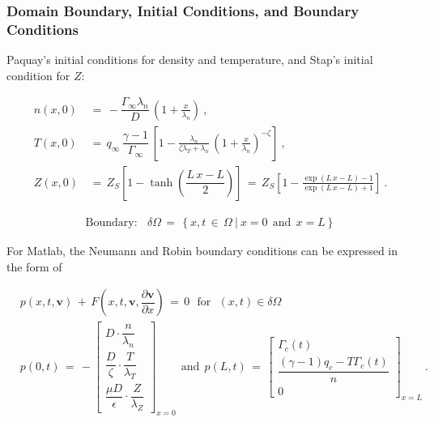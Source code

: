 \documentclass[a4paper,8pt]{article}
\begin{document}
\subsubsection{Domain Boundary, Initial Conditions, and Boundary
Conditions}\label{domain-boundary-initial-conditions-and-boundary-conditions}

Paquay's initial conditions for density and temperature, and Stap's
initial condition for \(Z\):

\begin{align}
    n(x,0) \,&=\, -\dfrac{\Gamma_\infty \lambda_n}{D} \, \left(1 + \frac{x}{\lambda_n}\right)~, \\
    T(x,0) \,&=\, q_\infty \, \dfrac{\gamma - 1}{\Gamma_\infty} \, \left[1 - \frac{\lambda_n}{\zeta \lambda_T + \lambda_n} \, \left(1 + \frac{x}{\lambda_n}\right)^{-\zeta}\right]~, \\
    Z(x,0) \,&=\, Z_S\left[1 - \tanh\left(\dfrac{L\,x - L}{2}\right)\right] \,=\, Z_S\left[1 - \frac{\exp(L\,x - L) - 1}{\exp(L\,x - L) + 1}\right]~.
\end{align}

\begin{align}
    \text{Boundary:}~~~~\delta \Omega \,=\, \left\{x, t \,\in\, \Omega ~|~ x = 0 ~~\text{and}~~ x = L\right\}
\end{align}

For Matlab, the Neumann and Robin boundary conditions can be expressed
in the form of

\begin{align}
    &p\left(x, t, \mathbf{v}\right) \,+\, F\left(x, t, \mathbf{v}, \dfrac{\partial\mathbf{v}}{\partial x}\right) \,=\, 0 ~~~ \text{for} ~~~ (x, t) \in \delta\Omega \\
&p(0, t) \,=\, -\begin{bmatrix}
                D \cdot \dfrac{n}{\lambda_n}\\[2ex]
                \dfrac{D}{\zeta} \cdot \dfrac{T}{\lambda_T} \\[2ex]
                \dfrac{\mu D}{\epsilon} \cdot \dfrac{Z}{\lambda_Z}
                \end{bmatrix}_{x = 0}
~~ \text{and} ~~
p(L, t) \,=\, \begin{bmatrix}
                \Gamma_c(t) \\[1ex]
                \dfrac{(\gamma - 1) q_c - T\Gamma_c(t)}{n} \\[2ex]
                0
                \end{bmatrix}_{x=L}~.
\end{align}
\end{document}
